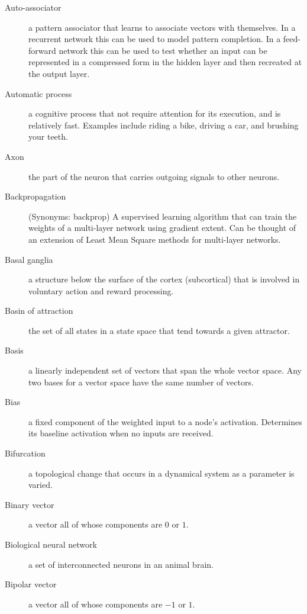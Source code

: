 \begin{description}
\item[Auto-associator] a pattern associator that learns to associate vectors with themselves. In a recurrent network this can be used to model pattern completion. In a feed-forward network this can be used to test whether an input can be represented in a compressed form in the hidden layer and then recreated at the output layer. 

\item[Automatic process] a cognitive process that not require attention for its execution, and is relatively fast. Examples include riding a bike, driving a car, and brushing your teeth.

\item[Axon] the part of the neuron that carries outgoing signals to other neurons.

\item[Backpropagation] (Synonyms: backprop) A supervised learning algorithm that can train the weights of a multi-layer network using gradient extent. Can be thought of an extension of Least Mean Square methods for multi-layer networks. 

\item[Basal ganglia] a structure below the surface of the cortex (subcortical) that is involved in voluntary action and reward processing.

\item[Basin of attraction] the set of all states in a state space that tend 
towards a given attractor.

\item[Basis] a linearly independent set of vectors that span the whole vector space. Any two bases for a vector space have the same number of vectors.

\item[Bias] a fixed component of the weighted input to a node's activation. Determines its baseline activation when no inputs are received.

\item[Bifurcation] a topological change that occurs in a dynamical system as a parameter is varied.

\item[Binary vector] a vector all of whose components are $0$ or $1$.

\item[Biological neural network] a set of interconnected neurons in an animal brain.

\item[Bipolar vector] a vector all of whose components are $-1$ or $1$.


\end{description}
